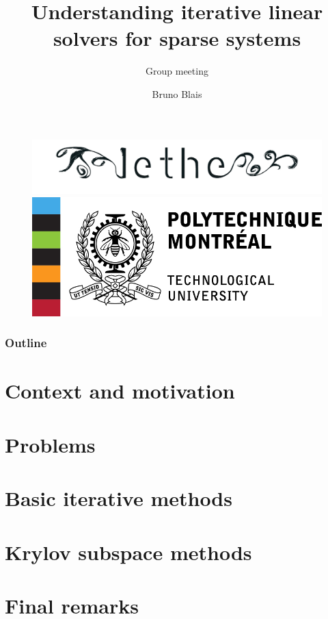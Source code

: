 \documentclass[t, 9pt,xcolor=dvipsnames]{beamer}
\title{\textbf{Understanding iterative linear solvers for sparse systems}}
\subtitle{Group meeting}
\author{Bruno Blais}
\begin{document}
	\begin{frame}
	\vspace{0.5cm}
		\begin{figure}
	  		\includegraphics[scale = 0.12]{images/logo_lethe.png}\hspace*{0.2cm}
	  		\includegraphics[scale = 0.4]{images/logo-poly.jpg}
		\end{figure}
		\titlepage
	\end{frame}
	
	\begin{frame}
		\frametitle{\textbf{Outline}}
		\tableofcontents
	\end{frame}
	
	\section{Context and motivation}
	
	
	\section{Problems}
	
	
	\section{Basic iterative methods}
	
	
	\section{Krylov subspace methods}
	
    	

    
	\section{Final remarks}
    
	
	
	\nocite{*} %
	    

    \appendix
\end{document}
